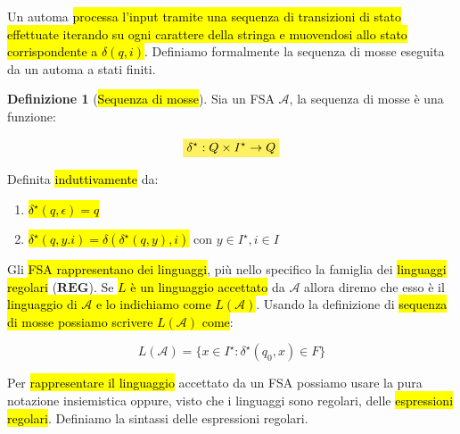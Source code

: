 \documentclass[a4paper,11pt,twoside]{article}
\theoremstyle{plain}
\theoremstyle{definition}
\newtheorem{defn}{Definizione}[section]
\theoremstyle{remark}
\newcommand{\mhl}[1]{\colorbox{hlcolor}{$\displaystyle #1$}}
\begin{document}
Un automa \hl{processa l'input tramite una sequenza di transizioni di stato
effettuate iterando su ogni carattere della stringa e muovendosi allo stato
corrispondente a $\delta(q, i)$}. Definiamo formalmente la sequenza di mosse
eseguita da un automa a stati finiti.

\begin{defn}[\hl{Sequenza di mosse}]\label{def:fsa-seq-mosse}
  Sia un FSA $\mathcal{A}$, la sequenza di mosse è una funzione:

  \begin{equation}
    \mhl{ \delta^\star: Q \times I^\star \to Q }
  \end{equation}

  Definita \hl{induttivamente} da:

  \begin{enumerate}
    \item \hl{$\delta^\star(q, \epsilon) = q$}
    \item \hl{$\delta^\star(q, y.i) = \delta(\delta^\star(q,y), i)$} con
      $y \in I^\star, i \in I$
  \end{enumerate}
\end{defn}

Gli \hl{FSA rappresentano dei linguaggi}, più nello specifico la famiglia dei
\hl{linguaggi regolari} ($\mathbf{REG}$). Se \hl{$L$ è un linguaggio accettato}
da $\mathcal{A}$ allora diremo che esso è il \hl{linguaggio di $\mathcal{A}$ e
lo indichiamo come $L(\mathcal{A})$}. Usando la definizione di \hl{sequenza di
mosse possiamo scrivere $L(\mathcal{A})$ come}:

\begin{equation}
  L(\mathcal{A}) = \{ x \in I^\star : \delta^\star(q_0, x) \in F \}
\end{equation}

Per \hl{rappresentare il linguaggio} accettato da un FSA possiamo usare la pura
notazione insiemistica oppure, visto che i linguaggi sono regolari, delle
\hl{espressioni regolari}. Definiamo la sintassi delle espressioni regolari.
\end{document}
